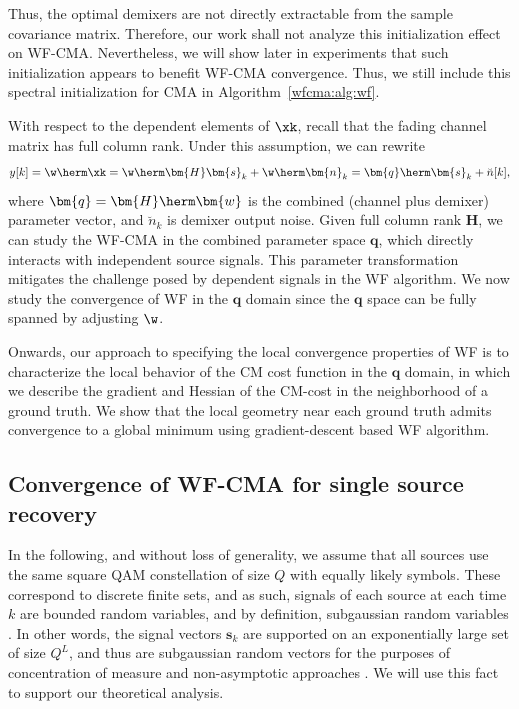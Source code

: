 Thus, the optimal demixers are not directly extractable from the sample covariance matrix. 
Therefore, our work shall not analyze this initialization effect on WF-CMA.  
Nevertheless, we will show later in experiments that such initialization appears to benefit WF-CMA convergence. Thus, we still include this spectral initialization for CMA in Algorithm~\ref{wfcma:alg:wf}.

With respect to the dependent elements of $\xk$, recall that the fading channel matrix has full column rank. Under this assumption, we can rewrite
\begin{align}
y[k]=\w\herm\xk=\w\herm\bm{H}\bm{s}_k+\w\herm\bm{n}_k=\bm{q}\herm\bm{s}_k+\breve{n}[k], \label{wfcma:eqn:parameter_space}
\end{align}
where $\bm{q}=\bm{H}\herm \bm{w}$ is the combined (channel plus demixer) parameter vector, 
and $\breve{n}_k$ is demixer output noise. 
Given full column rank $\bm{H}$, we can study the WF-CMA in the combined parameter space $\bm{q}$, which directly interacts with independent source signals. 
This parameter transformation mitigates the challenge posed by dependent signals in the WF algorithm.
We now study the convergence of WF in the $\bm{q}$ domain since the $\bm{q}$ space can be fully spanned by adjusting $\w$.

Onwards, our approach to specifying the local convergence properties of WF is to characterize the local behavior of the CM cost function in the $\bm{q}$  domain, in which we describe the gradient and Hessian of the CM-cost in the neighborhood of a ground truth. 
We show that the local geometry near each ground truth admits convergence to a global minimum using gradient-descent based WF algorithm.  

\subsection{Convergence of WF-CMA for single source recovery}
In the following, and without loss of generality, we assume that all sources use the same square QAM constellation of size $Q$ with equally likely symbols. These correspond to discrete finite sets, and as such, signals of each source at each time $k$ are bounded random variables, and by definition, subgaussian random variables \cite[Definition 5.7]{Vershynin2012nonasymptoticmatrices}. In other words, the signal vectors $\bm{s}_k$ are supported on an exponentially large set of size $Q^L$, and thus are subgaussian random vectors for the purposes of concentration of measure and non-asymptotic approaches \cite[Section 3.4.2]{Vershynin2018hdprobability}. We will use this fact to support our theoretical analysis.

